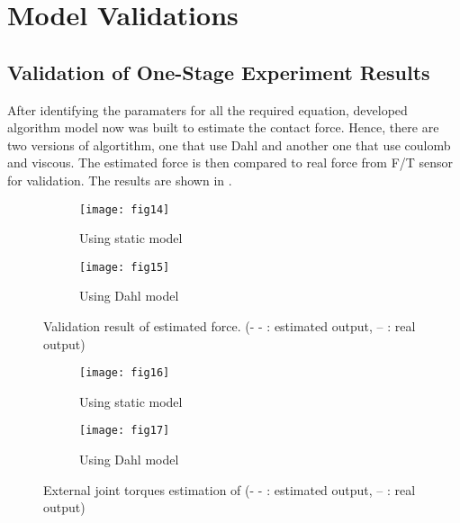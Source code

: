 \chapter{Model Validations}
\label{validation}

\section{Validation of One-Stage Experiment Results}

After identifying the paramaters for all the required equation, developed algorithm model now was built to estimate the contact force. Hence, there are two versions of algortithm, one that use Dahl and another one that use coulomb and viscous. The estimated force is then compared to real force from F/T sensor for validation. The results are shown in .

\begin{figure}[H]
  \begin{subfigure}[t]{0.5\textwidth}
    \centering
    \texttt{[image: fig14]} 
    \caption{Using static model}
    \label{fig:static validation}
  \end{subfigure}
  \begin{subfigure}[t]{0.5\textwidth}
    \centering
    \texttt{[image: fig15]}
    \caption{Using Dahl model}
    \label{fig:Dahl validation}
  \end{subfigure}
  \caption{Validation result of estimated force. (- - : estimated output, -- : real output)}
  \label{fig:validation}
\end{figure}

\begin{figure}[H]
  \begin{subfigure}[t]{0.5\textwidth}
    \centering
    \texttt{[image: fig16]} 
    \caption{Using static model}
    \label{fig:static tor}
  \end{subfigure}
  \begin{subfigure}[t]{0.5\textwidth}
    \centering
    \texttt{[image: fig17]}
    \caption{Using Dahl model}
    \label{fig:Dahl tor}
  \end{subfigure}
  \caption{External joint torques estimation of  (- - : estimated output, -- : real output)}
  \label{fig:torque validation}
\end{figure}


